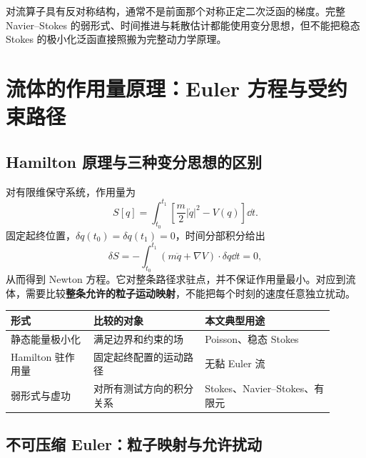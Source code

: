 \begin{keypoint}
对流算子具有反对称结构，通常不是前面那个对称正定二次泛函的梯度。完整 Navier--Stokes 的弱形式、时间推进与耗散估计都能使用变分思想，但不能把稳态 Stokes 的极小化泛函直接照搬为完整动力学原理。
\end{keypoint}

\section{流体的作用量原理：Euler 方程与受约束路径}\label{sec:variation-action}

\subsection{Hamilton 原理与三种变分思想的区别}

对有限维保守系统，作用量为
\begin{equation}
 S[q]=\int_{t_0}^{t_1}\left[\frac m2|\dot q|^2-V(q)\right]\dd t.
\end{equation}
固定起终位置，$\delta q(t_0)=\delta q(t_1)=0$，时间分部积分给出
\begin{equation}
 \delta S=-\int_{t_0}^{t_1}(m\ddot q+\nabla V)\cdot\delta q\dd t=0,
\end{equation}
从而得到 Newton 方程。它对整条路径求驻点，并不保证作用量最小。对应到流体，需要比较\textbf{整条允许的粒子运动映射}，不能把每个时刻的速度任意独立扰动。

\begin{center}
\renewcommand{\arraystretch}{1.25}
\begin{tabular}{p{0.23\linewidth}p{0.31\linewidth}p{0.36\linewidth}}
\toprule
形式 & 比较的对象 & 本文典型用途 \\
\midrule
静态能量极小化 & 满足边界和约束的场 & Poisson、稳态 Stokes \\
Hamilton 驻作用量 & 固定起终配置的运动路径 & 无黏 Euler 流 \\
弱形式与虚功 & 对所有测试方向的积分关系 & Stokes、Navier--Stokes、有限元 \\
\bottomrule
\end{tabular}
\end{center}

\subsection{不可压缩 Euler：粒子映射与允许扰动}

